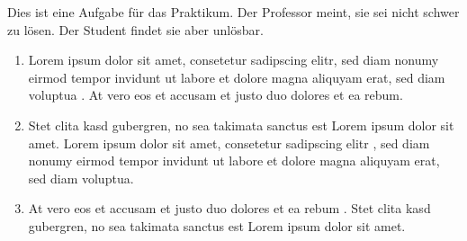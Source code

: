 Dies ist eine Aufgabe für das Praktikum.
Der Professor meint, sie sei nicht schwer zu lösen.
Der Student findet sie aber unlösbar.
\begin{enumerate}
\item Lorem ipsum dolor sit amet, consetetur sadipscing elitr, sed diam nonumy eirmod tempor invidunt ut labore et dolore magna aliquyam erat, sed diam voluptua . At vero eos et accusam et justo duo dolores et ea rebum. 
\item Stet clita kasd gubergren, no sea takimata sanctus est Lorem ipsum dolor sit amet. Lorem ipsum dolor sit amet, consetetur sadipscing elitr , sed diam nonumy eirmod tempor invidunt ut labore et dolore magna aliquyam erat, sed diam voluptua. 
\item At vero eos et accusam et justo duo dolores et ea rebum . Stet clita kasd gubergren, no sea takimata sanctus est Lorem ipsum dolor sit amet.  
\end{enumerate}

